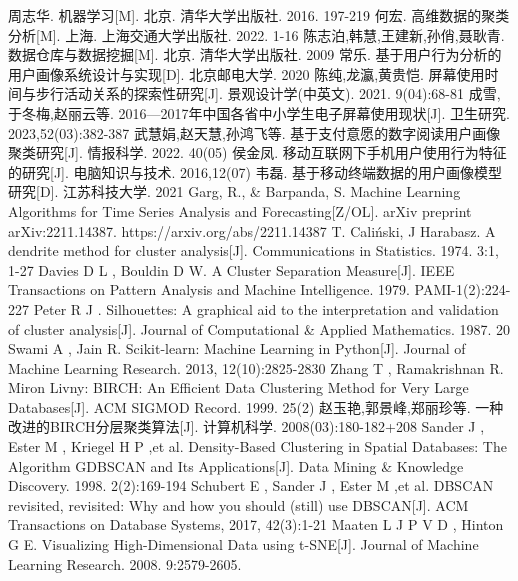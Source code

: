 \documentclass[withoutpreface,bwprint]{cumcmthesis}
\begin{document}
\newpage
\begin{thebibliography}{9}
     周志华. 机器学习[M]. 北京. 清华大学出版社. 2016. 197-219
     何宏. 高维数据的聚类分析[M]. 上海. 上海交通大学出版社. 2022. 1-16
     陈志泊,韩慧,王建新,孙俏,聂耿青. 数据仓库与数据挖掘[M]. 北京. 清华大学出版社. 2009
     常乐. 基于用户行为分析的用户画像系统设计与实现[D]. 北京邮电大学. 2020
     陈纯,龙瀛,黄贵恺. 屏幕使用时间与步行活动关系的探索性研究[J]. 景观设计学(中英文). 2021. 9(04):68-81
     成雪,于冬梅,赵丽云等. 2016—2017年中国各省中小学生电子屏幕使用现状[J]. 卫生研究. 2023,52(03):382-387
     武慧娟,赵天慧,孙鸿飞等. 基于支付意愿的数字阅读用户画像聚类研究[J]. 情报科学. 2022. 40(05)
     侯金凤. 移动互联网下手机用户使用行为特征的研究[J]. 电脑知识与技术. 2016,12(07)
     韦磊. 基于移动终端数据的用户画像模型研究[D]. 江苏科技大学. 2021
     Garg, R., \& Barpanda, S. Machine Learning Algorithms for Time Series Analysis and Forecasting[Z/OL]. arXiv preprint arXiv:2211.14387. https://arxiv.org/abs/2211.14387
     T. Caliński, J Harabasz. A dendrite method for cluster analysis[J]. Communications in Statistics. 1974. 3:1, 1-27
     Davies D L , Bouldin D W. A Cluster Separation Measure[J]. IEEE Transactions on Pattern Analysis and Machine Intelligence. 1979. PAMI-1(2):224-227
     Peter R J . Silhouettes: A graphical aid to the interpretation and validation of cluster analysis[J]. Journal of Computational \& Applied Mathematics. 1987. 20
     Swami A , Jain R. Scikit-learn: Machine Learning in Python[J]. Journal of Machine Learning Research. 2013, 12(10):2825-2830
     Zhang T , Ramakrishnan R. Miron Livny: BIRCH: An Efficient Data Clustering Method for Very Large Databases[J]. ACM SIGMOD Record. 1999. 25(2)
     赵玉艳,郭景峰,郑丽珍等. 一种改进的BIRCH分层聚类算法[J]. 计算机科学. 2008(03):180-182+208
     Sander J , Ester M , Kriegel H P ,et al. Density-Based Clustering in Spatial Databases: The Algorithm GDBSCAN and Its Applications[J]. Data Mining \& Knowledge Discovery. 1998. 2(2):169-194
     Schubert E , Sander J , Ester M ,et al. DBSCAN revisited, revisited: Why and how you should (still) use DBSCAN[J]. ACM Transactions on Database Systems, 2017, 42(3):1-21
     Maaten L J P V D , Hinton G E. Visualizing High-Dimensional Data using t-SNE[J]. Journal of Machine Learning Research. 2008. 9:2579-2605.
\end{thebibliography}
\end{document}
